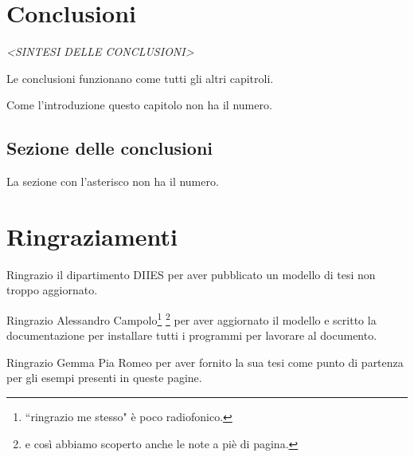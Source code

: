 \documentclass[envcountsame,envcountchap]{svmono}
\begin{document}
\chapter*{Conclusioni}

\vspace{2cm}

\begin{flushright}
 \textit{<SINTESI DELLE CONCLUSIONI>}
\end{flushright}

\vspace{0.5cm}

Le conclusioni funzionano come tutti gli altri capitroli.

Come l'introduzione questo capitolo non ha il numero.

\section*{Sezione delle conclusioni}
La sezione con l'asterisco non ha il numero.

\chapter*{Ringraziamenti}

Ringrazio il dipartimento DIIES per aver pubblicato un modello di tesi non troppo aggiornato.

Ringrazio Alessandro Campolo\footnote{``ringrazio me stesso" è poco radiofonico.} \footnote{e così abbiamo scoperto anche le note a piè di pagina.}
per aver aggiornato il modello e scritto la documentazione per installare tutti i programmi per lavorare al documento.

Ringrazio Gemma Pia Romeo per aver fornito la sua tesi come punto di partenza per gli esempi presenti in queste pagine.






\end{document}
